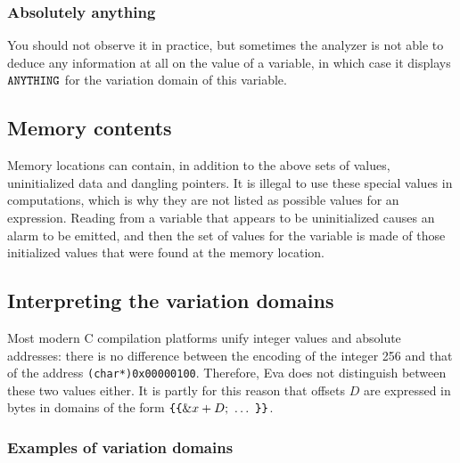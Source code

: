 \documentclass[web]{frama-c-book}
\newcommand{\cbopen}{\mbox{\tt \{}}
\newcommand{\cbclose}{\mbox{\tt \}}}
\newcommand{\Eva}{\textsf{Eva}}
\begin{document}
\subsubsection{Absolutely anything}
You should not observe it in practice, but sometimes the analyzer is
not able to deduce any information at all on the value of a variable,
in which case it displays $\mbox{\tt ANYTHING}$ for the variation
domain of this variable.

\subsection{Memory contents}

Memory locations can contain, in addition to the above sets of values,
uninitialized data and dangling pointers. It is illegal to use these
special values in computations, which is why they are not listed as
possible values for an expression. Reading from a variable that
appears to be uninitialized causes an alarm to be emitted, and
then the set of values for the variable is made of those initialized
values that were found at the memory location.

\subsection{Interpreting the variation domains}

Most modern C compilation platforms unify integer values
and absolute addresses:
there is no difference between the encoding of the integer 256
and that of the address \lstinline|(char*)0x00000100|. Therefore, \Eva{}
does not distinguish between these two values either. It is partly 
for this reason that offsets $D$ are expressed
in bytes in domains of the form $\cbopen\cbopen \&x + D;\ \ldots\ \cbclose\cbclose$.

\subsubsection{Examples of variation domains}
\end{document}
